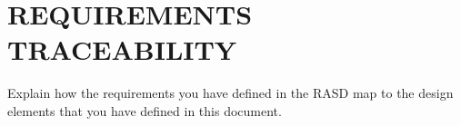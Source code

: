 \section{REQUIREMENTS  TRACEABILITY}  
Explain  how  the  requirements  you  have  defined  in  the  RASD map to the design elements that you have defined in this document.